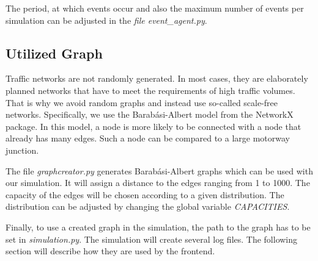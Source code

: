 The period, at which events occur and also the maximum number of events per simulation can be adjusted in the \textit{file event\_agent.py}.



\subsection{Utilized Graph}\label{subsec:graph}
Traffic networks are not randomly generated. In most cases, they are elaborately planned networks that have to meet the requirements of high traffic volumes. That is why we avoid random graphs and instead use so-called scale-free networks. Specifically, we use the Barabási-Albert  model from the NetworkX package.  In this model, a node is more likely to be connected with a node that already has many edges. Such a node can be compared to a large motorway junction.

The file \textit{graphcreator.py} generates Barabási-Albert graphs \cite{barabasi1999graph} which can be used with our simulation. It will assign a distance to the edges ranging from 1 to 1000. The capacity of the edges will be chosen according to a given distribution. The distribution can be adjusted by changing the global variable \textit{CAPACITIES}.

Finally, to use a created graph in the simulation, the path to the graph has to be set in \textit{simulation.py}. The simulation will create several log files. The following section will describe how they are used by the frontend.


